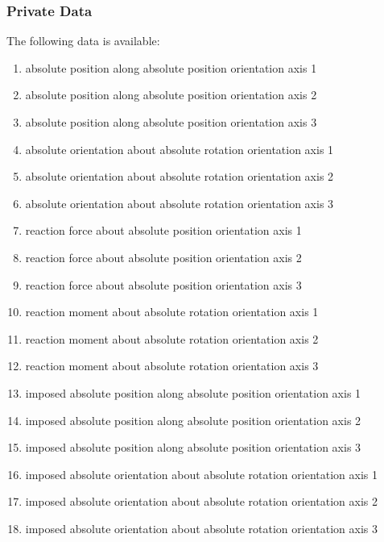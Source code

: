 \subsubsection{Private Data}
The following data is available:
\begin{enumerate}
\item {} absolute position along absolute position orientation axis 1
\item {} absolute position along absolute position orientation axis 2
\item {} absolute position along absolute position orientation axis 3

\item {} absolute orientation about absolute rotation orientation axis 1
\item {} absolute orientation about absolute rotation orientation axis 2
\item {} absolute orientation about absolute rotation orientation axis 3

\item {} reaction force about absolute position orientation axis 1
\item {} reaction force about absolute position orientation axis 2
\item {} reaction force about absolute position orientation axis 3

\item {} reaction moment about absolute rotation orientation axis 1
\item {} reaction moment about absolute rotation orientation axis 2
\item {} reaction moment about absolute rotation orientation axis 3

\item {} imposed absolute position along absolute position orientation axis 1
\item {} imposed absolute position along absolute position orientation axis 2
\item {} imposed absolute position along absolute position orientation axis 3

\item {} imposed absolute orientation about absolute rotation orientation axis 1
\item {} imposed absolute orientation about absolute rotation orientation axis 2
\item {} imposed absolute orientation about absolute rotation orientation axis 3


\end{enumerate}
